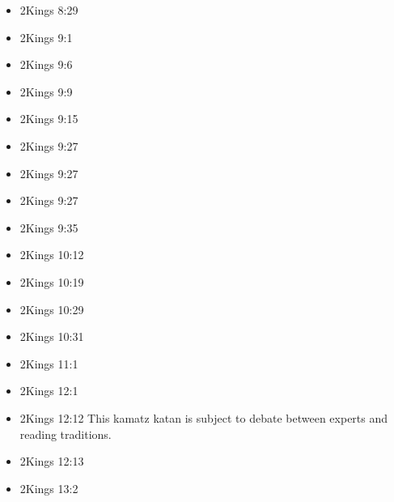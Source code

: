 \documentclass[14pt]{book}
\begin{document}
\begin{multicols}{2}
\begin{itemize}
													\item 2Kings 8:29
													
													\item 2Kings 9:1
													
													\item 2Kings 9:6
													
													\item 2Kings 9:9
													
													\item 2Kings 9:15
													
													\item 2Kings 9:27
													
													\item 2Kings 9:27
													
													\item 2Kings 9:27
													
													\item 2Kings 9:35
													
													\item 2Kings 10:12
													
													\item 2Kings 10:19
													
													\item 2Kings 10:29
													
													\item 2Kings 10:31
													
													\item 2Kings 11:1
													
													\item 2Kings 12:1
													
													\item 2Kings 12:12 This kamatz katan is subject to debate between experts and reading traditions.
													
													\item 2Kings 12:13
													
													\item 2Kings 13:2
													

\end{itemize}
\end{multicols}
\end{document}
